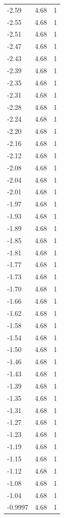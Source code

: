 \begin{longtable}{lrr}
  -2.59 & 4.68 & 1 \\
  -2.55 & 4.68 & 1 \\
  -2.51 & 4.68 & 1 \\
  -2.47 & 4.68 & 1 \\
  -2.43 & 4.68 & 1 \\
  -2.39 & 4.68 & 1 \\
  -2.35 & 4.68 & 1 \\
  -2.31 & 4.68 & 1 \\
  -2.28 & 4.68 & 1 \\
  -2.24 & 4.68 & 1 \\
  -2.20 & 4.68 & 1 \\
  -2.16 & 4.68 & 1 \\
  -2.12 & 4.68 & 1 \\
  -2.08 & 4.68 & 1 \\
  -2.04 & 4.68 & 1 \\
  -2.01 & 4.68 & 1 \\
  -1.97 & 4.68 & 1 \\
  -1.93 & 4.68 & 1 \\
  -1.89 & 4.68 & 1 \\
  -1.85 & 4.68 & 1 \\
  -1.81 & 4.68 & 1 \\
  -1.77 & 4.68 & 1 \\
  -1.73 & 4.68 & 1 \\
  -1.70 & 4.68 & 1 \\
  -1.66 & 4.68 & 1 \\
  -1.62 & 4.68 & 1 \\
  -1.58 & 4.68 & 1 \\
  -1.54 & 4.68 & 1 \\
  -1.50 & 4.68 & 1 \\
  -1.46 & 4.68 & 1 \\
  -1.43 & 4.68 & 1 \\
  -1.39 & 4.68 & 1 \\
  -1.35 & 4.68 & 1 \\
  -1.31 & 4.68 & 1 \\
  -1.27 & 4.68 & 1 \\
  -1.23 & 4.68 & 1 \\
  -1.19 & 4.68 & 1 \\
  -1.15 & 4.68 & 1 \\
  -1.12 & 4.68 & 1 \\
  -1.08 & 4.68 & 1 \\
  -1.04 & 4.68 & 1 \\
  -0.9997 & 4.68 & 1 \\

\end{longtable}
